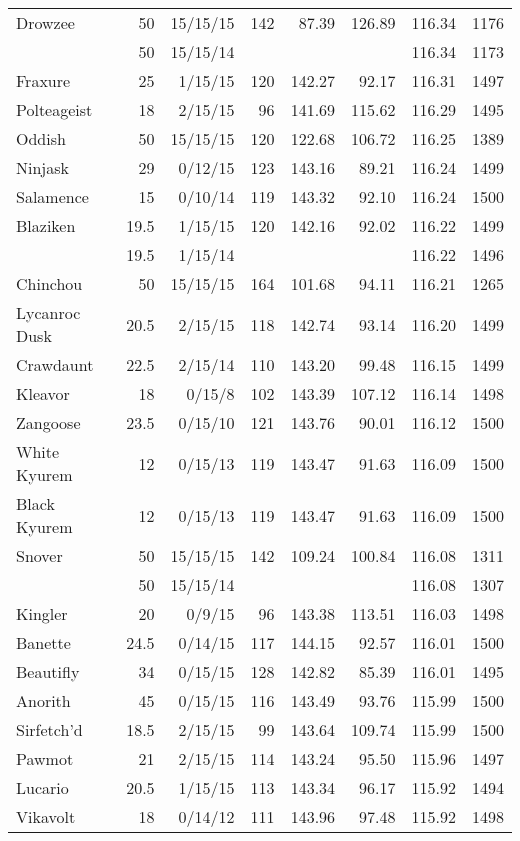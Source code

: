 \begin{longtable}{lrrrrrrr}
Drowzee & 50 & 15/15/15 & 142 & 87.39 & 126.89 & 116.34 & 1176\\
 & 50 & 15/15/14 & & & & 116.34 & 1173\\
Fraxure & 25 & 1/15/15 & 120 & 142.27 & 92.17 & 116.31 & 1497\\
Polteageist & 18 & 2/15/15 & 96 & 141.69 & 115.62 & 116.29 & 1495\\
Oddish & 50 & 15/15/15 & 120 & 122.68 & 106.72 & 116.25 & 1389\\
Ninjask & 29 & 0/12/15 & 123 & 143.16 & 89.21 & 116.24 & 1499\\
Salamence & 15 & 0/10/14 & 119 & 143.32 & 92.10 & 116.24 & 1500\\
Blaziken & 19.5 & 1/15/15 & 120 & 142.16 & 92.02 & 116.22 & 1499\\
 & 19.5 & 1/15/14 & & & & 116.22 & 1496\\
Chinchou & 50 & 15/15/15 & 164 & 101.68 & 94.11 & 116.21 & 1265\\
Lycanroc Dusk & 20.5 & 2/15/15 & 118 & 142.74 & 93.14 & 116.20 & 1499\\
Crawdaunt & 22.5 & 2/15/14 & 110 & 143.20 & 99.48 & 116.15 & 1499\\
Kleavor & 18 & 0/15/8 & 102 & 143.39 & 107.12 & 116.14 & 1498\\
Zangoose & 23.5 & 0/15/10 & 121 & 143.76 & 90.01 & 116.12 & 1500\\
White Kyurem & 12 & 0/15/13 & 119 & 143.47 & 91.63 & 116.09 & 1500\\
Black Kyurem & 12 & 0/15/13 & 119 & 143.47 & 91.63 & 116.09 & 1500\\
Snover & 50 & 15/15/15 & 142 & 109.24 & 100.84 & 116.08 & 1311\\
 & 50 & 15/15/14 & & & & 116.08 & 1307\\
Kingler & 20 & 0/9/15 & 96 & 143.38 & 113.51 & 116.03 & 1498\\
Banette & 24.5 & 0/14/15 & 117 & 144.15 & 92.57 & 116.01 & 1500\\
Beautifly & 34 & 0/15/15 & 128 & 142.82 & 85.39 & 116.01 & 1495\\
Anorith & 45 & 0/15/15 & 116 & 143.49 & 93.76 & 115.99 & 1500\\
Sirfetch'd & 18.5 & 2/15/15 & 99 & 143.64 & 109.74 & 115.99 & 1500\\
Pawmot & 21 & 2/15/15 & 114 & 143.24 & 95.50 & 115.96 & 1497\\
Lucario & 20.5 & 1/15/15 & 113 & 143.34 & 96.17 & 115.92 & 1494\\
Vikavolt & 18 & 0/14/12 & 111 & 143.96 & 97.48 & 115.92 & 1498\\

\end{longtable}
